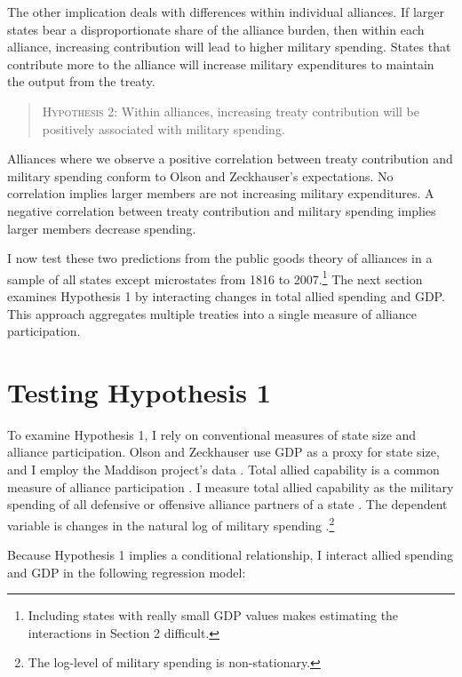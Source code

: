 \documentclass[12pt]{article}
\begin{document}
The other implication deals with differences within individual alliances. 
If larger states bear a disproportionate share of the alliance burden, then within each alliance, increasing contribution will lead to higher military spending. 
States that contribute more to the alliance will increase military expenditures to maintain the output from the treaty. 


\begin{quote}
\textsc{Hypothesis 2}: Within alliances, increasing treaty contribution will be positively associated with military spending. 
\end{quote}


Alliances where we observe a positive correlation between treaty contribution and military spending conform to Olson and Zeckhauser's expectations. 
No correlation implies larger members are not increasing military expenditures.
A negative correlation between treaty contribution and military spending implies larger members decrease spending. 


I now test these two predictions from the public goods theory of alliances in a sample of all states except microstates from 1816 to 2007.\footnote{Including states with really small GDP values makes estimating the interactions in Section 2 difficult.}
The next section examines Hypothesis 1 by interacting changes in total allied spending and GDP.
This approach aggregates multiple treaties into a single measure of alliance participation. 


\section{Testing Hypothesis 1}

To examine Hypothesis 1, I rely on conventional measures of state size and alliance participation. 
Olson and Zeckhauser use GDP as a proxy for state size, and I employ the Maddison project's data \citep{Boltetal2018}. 
Total allied capability is a common measure of alliance participation \citep{Sorokin1994, MorganPalmer2003}. 
I measure total allied capability as the military spending of all defensive or offensive alliance partners of a state \citep{Leedsetal2002}. 
The dependent variable is changes in the natural log of military spending \citep{SingerCINC1988}.\footnote{The log-level of military spending is non-stationary.}


Because Hypothesis 1 implies a conditional relationship, I interact allied spending and GDP in the following regression model:
\end{document}
